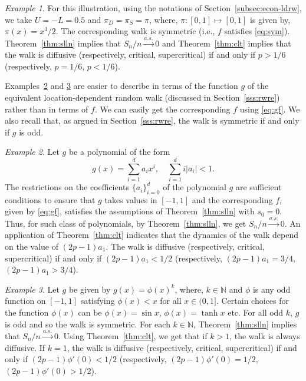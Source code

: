 \documentclass[12pt]{amsart}
\theoremstyle{plain}
\theoremstyle{remark}
\newtheorem{example}{Example}[subsection]
\numberwithin{equation}{section}
\begin{document}
\begin{example}\label{geg-0}
For this illustration, using the notations of Section~\ref{subsec:econ-ldrw}, we take $U = -L = 0.5$ and $\pi_D = \pi_S = \pi$, where, $\pi: [0,1] \mapsto [0,1]$ is given by, $\pi(x) = x^3/2$. The corresponding walk is symmetric (i.e., $f$ satisfies \eqref{eq:sym}). Theorem~\ref{thm:slln} implies that $S_n/n \stackrel{a.s.}{\to} 0$ and Theorem~\ref{thm:clt} implies that the walk is diffusive (respectively, critical, supercritical) if and only if $p > 1/6$ (respectively, $p = 1/6$, $p < 1/6$). %
\end{example}

{Examples~\ref{geg-2a} and \ref{geg-2}} are easier to describe in terms of the function $g$ of the equivalent location-dependent random walk (discussed in Section~\ref{sss:rwre}) rather than in terms of $f$. We can easily get the corresponding $f$ using \eqref{eq:gf}. We also recall that, as argued in Section~\ref{sss:rwre}, the walk is symmetric if and only if $g$ is odd. 

\begin{example}\label{geg-2a}
     Let $g$ be a polynomial of the form \[{g(x) = \sum_{i=1}^da_ix^i},\quad \sum_{i=1}^d i|a_i| < 1.\] The restrictions on the coefficients $\{a_i\}_{i=0}^d$ of the polynomial $g$ are sufficient conditions to ensure that $g$ takes values in $[-1,1]$ and the corresponding $f$, given by \eqref{eq:gf}, satisfies the assumptions of Theorem~\ref{thm:slln} with $s_0 = 0$. Thus, for such class of polynomials, by Theorem~\ref{thm:slln}, we get $S_n/n \stackrel{a.s.}{\to} 0$. An application of Theorem~\ref{thm:clt} indicates that the dynamics of the walk depend on the value of $(2p-1)a_1$. The walk is diffusive (respectively, critical, supercritical) if and only if $(2p-1)a_1 < 1/2$ (respectively, $(2p-1)a_1 = 3/4$, $(2p-1)a_1 > 3/4$).
\end{example}

\begin{example}\label{geg-2}
   Let $g$ be given by $g(x) = \phi(x)^k$, where, $k \in \mathbb{N}$ and $\phi$ is any odd function on $[-1,1]$ satisfying $\phi(x) < x$ for all $x \in (0,1]$. Certain choices for the function $\phi(x)$ can be  $\phi(x) = \sin x$, $\phi(x) = \tanh x$ etc. For all odd $k$, $g$ is odd and so the walk is symmetric. For each $k \in \mathbb{N}$, Theorem~\ref{thm:slln} implies that $S_n/n \stackrel{a.s.}{\to} 0$. Using Theorem~\ref{thm:clt}, we get that if $k > 1$, the walk is always diffusive. If $k=1$, the walk is diffusive (respectively, critical, supercritical) if and only if $(2p-1)\phi'(0) < 1/2$ (respectively, $(2p-1)\phi'(0) = 1/2$, $(2p-1)\phi'(0) > 1/2$).
\end{example}
\end{document}
